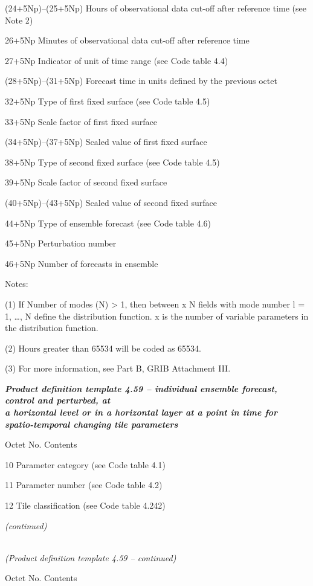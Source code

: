 (24+5Np)--(25+5Np) Hours of observational data cut-off after reference time (see Note 2)

26+5Np Minutes of observational data cut-off after reference time

27+5Np Indicator of unit of time range (see Code table 4.4)

(28+5Np)--(31+5Np) Forecast time in units defined by the previous octet

32+5Np Type of first fixed surface (see Code table 4.5)

33+5Np Scale factor of first fixed surface

(34+5Np)--(37+5Np) Scaled value of first fixed surface

38+5Np Type of second fixed surface (see Code table 4.5)

39+5Np Scale factor of second fixed surface

(40+5Np)--(43+5Np) Scaled value of second fixed surface

44+5Np Type of ensemble forecast (see Code table 4.6)

45+5Np Perturbation number

46+5Np Number of forecasts in ensemble

Notes:

(1) If Number of modes (N) \textgreater{} 1, then between x N fields with mode number l = 1, \ldots, N define the distribution function. x is the number of variable parameters in the distribution function.

(2) Hours greater than 65534 will be coded as 65534.

(3) For more information, see Part B, GRIB Attachment III.

\emph{\textbf{Product definition template 4.59 -- individual ensemble forecast, control and perturbed, at\\
a horizontal level or in a horizontal layer at a point in time for\\
spatio-temporal changing tile parameters}}

Octet No. Contents

10 Parameter category (see Code table 4.1)

11 Parameter number (see Code table 4.2)

12 Tile classification (see Code table 4.242)

\emph{(continued)}

\emph{\\
(Product definition template 4.59 -- continued)}

Octet No. Contents

